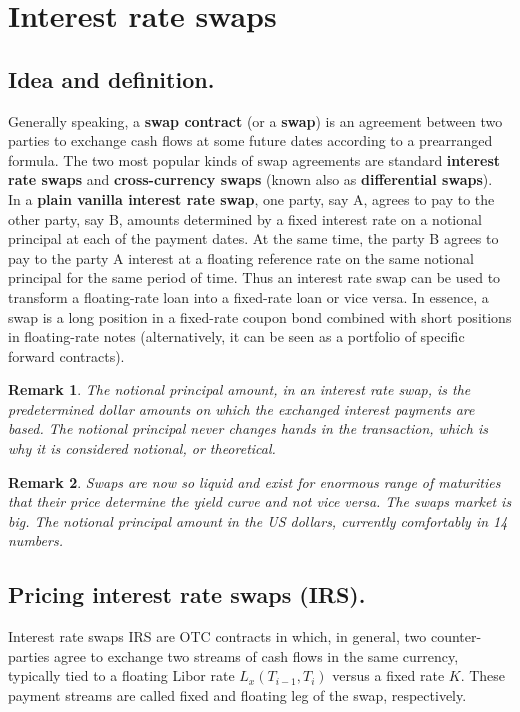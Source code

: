 \documentclass{book}
\newtheorem{remark}{Remark}[section]
\begin{document}
\section{Interest rate swaps} 
\subsection{Idea and definition.}
Generally speaking, a \textbf{swap contract} (or a \textbf{swap}) is an agreement between two parties
to exchange cash flows at some future dates according to a prearranged formula. The two most popular kinds of swap agreements are standard \textbf{interest rate swaps} and \textbf{cross-currency swaps} (known also as \textbf{differential swaps}).\\
In a \textbf{plain vanilla interest rate swap}, one party, say A, agrees to pay to the other party, say B, amounts determined by a fixed interest rate on a notional principal at each of the payment dates. At the same time, the party B agrees to pay to the party A interest at a floating reference rate on the same notional principal for the same period of time. Thus an interest rate swap can be used to transform a floating-rate loan into a fixed-rate loan or vice versa. In essence, a swap is a long position in a fixed-rate coupon bond combined with short positions in floating-rate notes (alternatively, it can be seen as a portfolio of specific forward contracts). 
\begin{remark}
The notional principal amount, in an interest rate swap, is the predetermined dollar amounts on which the exchanged interest payments are based. The notional principal never changes hands in the transaction, which is why it is considered notional, or theoretical.
\end{remark}
\begin{remark}
Swaps are now so liquid and exist for enormous range of maturities that their price determine the yield curve and not vice versa. The swaps market is big. The notional principal amount in the US dollars, currently comfortably in 14 numbers.
\end{remark}
\subsection{Pricing interest rate swaps (IRS).}
Interest rate swaps IRS are OTC contracts in which, in general, two counter-parties agree to exchange two streams of cash flows in the same currency, typically tied to a floating Libor rate $L_{x}(T_{i-1},T_{i})$ versus a fixed rate $K$. These payment streams are called fixed and floating leg of the swap, respectively.
\end{document}

